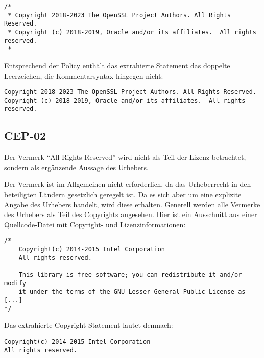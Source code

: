 \begin{lstlisting}[numbers=none, keepspaces=true]
/*
 * Copyright 2018-2023 The OpenSSL Project Authors. All Rights Reserved.
 * Copyright (c) 2018-2019, Oracle and/or its affiliates.  All rights reserved.
 *
\end{lstlisting}

Entsprechend der Policy enthält das extrahierte Statement das doppelte Leerzeichen, die Kommentarsyntax hingegen nicht:
\begin{lstlisting}[numbers=none, keepspaces=true]
Copyright 2018-2023 The OpenSSL Project Authors. All Rights Reserved.
Copyright (c) 2018-2019, Oracle and/or its affiliates.  All rights reserved.
\end{lstlisting}


\subsection{CEP-02}\label{subsec:cep-02}

Der Vermerk \enquote{All Rights Reserved} wird nicht als Teil der Lizenz betrachtet, sondern als ergänzende Aussage des Urhebers.

Der Vermerk ist im Allgemeinen nicht erforderlich, da das Urheberrecht in den beteiligten Ländern gesetzlich geregelt ist.
Da es sich aber um eine explizite Angabe des Urhebers handelt, wird diese erhalten.
Generell werden alle Vermerke des Urhebers als Teil des Copyrights angesehen.
Hier ist ein Ausschnitt aus einer Quellcode-Datei mit Copyright- und Lizenzinformationen:

\begin{lstlisting}[numbers=none, keepspaces=true]
/*
    Copyright(c) 2014-2015 Intel Corporation
    All rights reserved.

    This library is free software; you can redistribute it and/or modify
    it under the terms of the GNU Lesser General Public License as [...]
*/
\end{lstlisting}

Das extrahierte Copyright Statement lautet demnach:

\begin{lstlisting}[numbers=none, keepspaces=true]
Copyright(c) 2014-2015 Intel Corporation
All rights reserved.
\end{lstlisting}

